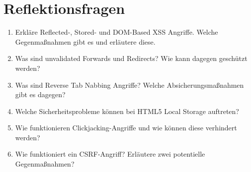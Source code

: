 \section{Reflektionsfragen}

\begin{enumerate}
\item Erkläre Reflected-, Stored- und DOM-Based XSS Angriffe. Welche Gegenmaßnahmen gibt es und erläutere diese.
\item Was sind unvalidated Forwards und Redirects? Wie kann dagegen geschützt werden?
\item Was sind Reverse Tab Nabbing Angriffe? Welche Absicherungsmaßnahmen gibt es dagegen?
\item Welche Sicherheitsprobleme können bei HTML5 Local Storage auftreten?
\item Wie funktionieren Clickjacking-Angriffe und wie können diese verhindert werden?
\item Wie funktioniert ein CSRF-Angriff? Erläutere zwei potentielle Gegenmaßnahmen?
\end{enumerate}
